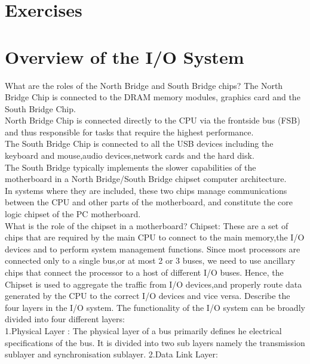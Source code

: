 \section*{Exercises}
\vskip 1cm

\setcounter{Exercise}{0}
\setcounter{Answer}{0}

\section*{Overview of the I/O System}

\begin{ExerciseList}
\Exercise
What are the roles of the North Bridge and South Bridge chips?
\Answer
The North Bridge Chip is connected to the DRAM memory modules, graphics card and the South Bridge Chip.\\
North Bridge Chip is connected directly to the CPU via the frontside bus (FSB) and thus responsible for tasks that require the highest performance.\\
The South Bridge Chip is connected to all the USB devices including the keyboard and mouse,audio devices,network cards and the hard disk.\\
The South Bridge typically implements the slower capabilities of the motherboard in a North Bridge/South Bridge chipset computer architecture. \\
In systems where they are included, these two chips manage communications between the CPU and other parts of the motherboard, and constitute the core logic chipset of the PC motherboard.
\\
\Exercise
What is the role of the chipset in a motherboard?
\Answer
Chipset: These are a set of chips that are required by the main CPU to connect to the main memory,the I/O devices and to perform system management functions.
Since most processors are connected only to a single bus,or at most 2 or 3 buses, we need to use ancillary chips that connect the processor to a host of different I/O buses. Hence, the Chipset is used to aggregate the traffic from I/O devices,and properly route data generated by the CPU to the correct I/O devices and vice versa. 
\Exercise
Describe the four layers in the I/O system.
\Answer
The functionality of the I/O system can be broadly divided into four different layers: \\
1.Physical Layer :
The physical layer of a bus primarily defines he electrical specifications of the bus. It is divided into two sub layers namely the transmission sublayer and synchronisation sublayer.
2.Data Link Layer:

\end{ExerciseList}
